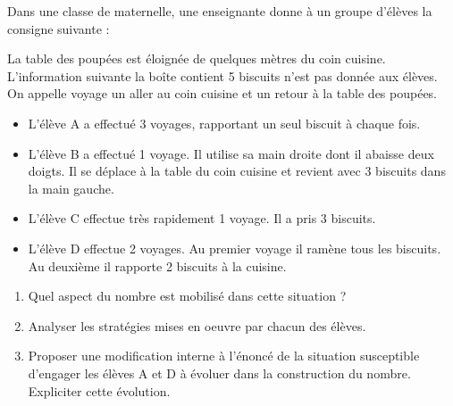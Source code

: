 \begin{exercice}[CRPE 2017 G1]
Dans une classe de maternelle, une enseignante donne à un groupe d’élèves la consigne suivante :
\begin{center}
\end{center}
La table des poupées est éloignée de quelques mètres du coin cuisine. \\
L’information suivante \og la boîte contient 5 biscuits \fg{} n’est pas donnée aux élèves. \\
On appelle \og voyage \fg{} un aller au coin cuisine et un retour à la table des poupées.
\begin{itemize}
   \item L’élève A a effectué 3 voyages, rapportant un seul biscuit à chaque fois.
   \item L’élève B a effectué 1 voyage. Il utilise sa main droite dont il abaisse deux doigts. Il se déplace à la table du coin cuisine et revient avec 3 biscuits dans la main gauche.
   \item L’élève C effectue très rapidement 1 voyage. Il a pris 3 biscuits.
   \item L’élève D effectue 2 voyages. Au premier voyage il ramène tous les biscuits. Au deuxième il rapporte 2 biscuits à la cuisine.
\end{itemize}
\vspace*{-5mm}
\begin{enumerate}
   \item Quel aspect du nombre est mobilisé dans cette situation ?
   \item Analyser les stratégies mises en oeuvre par chacun des élèves.
   \item Proposer une modification interne à l’énoncé de la situation susceptible d’engager les élèves A et D à évoluer dans la construction du nombre. Expliciter cette évolution.
\end{enumerate}
\end{exercice}

